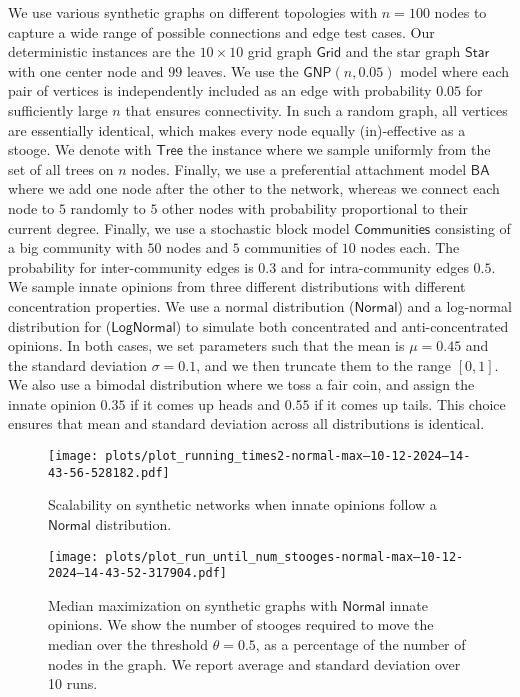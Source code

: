We use various synthetic graphs on
different topologies with $n=100$ nodes
to capture a wide range of possible
connections and edge test cases. Our deterministic instances
are the $10 \times 10$ grid graph 
$\textsf{Grid}$ and
the star graph $\textsf{Star}$ with
one center node and
$99$ leaves. We use the
$\textsf{GNP}(n, 0.05)$ model
\cite{erdds1959random}
where each pair of vertices
is independently included as an
edge with probability $0.05$ for sufficiently large $n$ that ensures connectivity.
In such a random graph, all
vertices are essentially identical,
which makes every node equally
(in)-effective as a stooge.
%
We denote with $\textsf{Tree}$
the instance where we sample
uniformly from the set of all
trees on $n$ nodes. Finally,
we use a preferential attachment
model $\textsf{BA}$ where we add
one node after the other to the
network, whereas we connect
each node to $5$ randomly to
$5$ other nodes with probability
proportional to their current
degree.
Finally, we use a stochastic
block model $\textsf{Communities}$
consisting of a big community
with $50$ nodes and $5$ communities
of $10$ nodes each. The probability
for inter-community edges is $0.3$
and for intra-community edges $0.5$.
%
We sample innate opinions from three
different distributions with different
concentration properties. We use
a normal distribution
($\textsf{Normal}$)
and 
a log-normal distribution for
($\textsf{LogNormal}$)
to simulate both concentrated
and anti-concentrated opinions.
In both cases, we set parameters
such that the mean is $\mu=0.45$
and the standard deviation
$\sigma=0.1$, and we then truncate
them to the range $[0, 1]$.
We also use a bimodal distribution
where we toss a fair coin,
and assign the innate opinion $0.35$
if it comes up heads and $0.55$
if it comes up tails.
This choice ensures that mean
and standard deviation
across all distributions is
identical.



\begin{figure}
    \centering
    \texttt{[image: plots/plot\_running\_times2-normal-max--10-12-2024--14-43-56-528182.pdf]}
    \caption{Scalability on synthetic
    networks when innate opinions follow
    a $\textsf{Normal}$ distribution.}
    \label{fig:scalability-synthetic}
\end{figure}


\begin{figure}
    \centering
    \texttt{[image: plots/plot\_run\_until\_num\_stooges-normal-max--10-12-2024--14-43-52-317904.pdf]}
    \figsp
    \caption{
    \label{fig:synthetic-normal}
    Median maximization on synthetic graphs
    with $\textsf{Normal}$ innate opinions.
    We show the number
    of stooges required to move the median
    over the threshold $\theta = 0.5$, as a percentage of the number of nodes in the graph. We report average and standard deviation over 10 runs.}
\end{figure}

